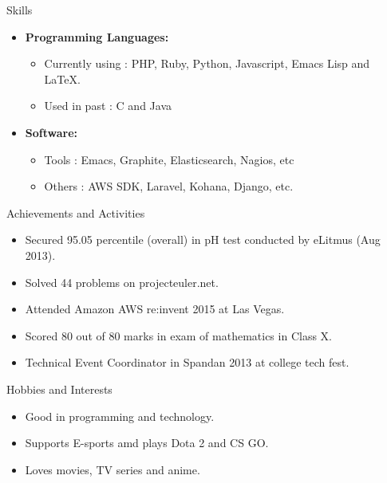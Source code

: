 \documentclass[11pt,oneside]{article}
\newenvironment{ressection}[1]{
  \vspace{4pt}
         {\fontfamily{phv}\selectfont\Large#1}
         \begin{itemize}
           \vspace{3pt}
}{
         \end{itemize}
}
\newcommand{\resitem}[1]{
  \vspace{-4pt}
\item \begin{flushleft} #1 \end{flushleft}
}
\newcommand{\ressubitem}[1]{
  \vspace{-1pt}
\item \begin{flushleft} #1 \end{flushleft}
}
\newenvironment{reslist}[1]{
  \resitem{\textbf{#1}}
  \vspace{-5pt}
  \begin{itemize}
}{
  \end{itemize}
}
\begin{document}

\begin{ressection}{Skills}
  \begin{reslist}{Programming Languages:}
    \ressubitem{Currently using : PHP, Ruby, Python, Javascript, Emacs Lisp and \LaTeX.}
    \ressubitem{Used in past : C and Java}
  \end{reslist}
  \begin{reslist}{Software:}
    \ressubitem{Tools : Emacs, Graphite, Elasticsearch, Nagios, etc}
    \ressubitem{Others : AWS SDK, Laravel, Kohana, Django, etc.}
  \end{reslist}
\end{ressection}


\begin{ressection}{Achievements and Activities}
  \resitem{Secured 95.05 percentile (overall) in pH test conducted by eLitmus (Aug 2013).}
  \resitem{Solved 44 problems on projecteuler.net.}
  \resitem{Attended Amazon AWS re:invent 2015 at Las Vegas.}
  \resitem{Scored 80 out of 80 marks in exam of mathematics in Class X.}
  \resitem{Technical Event Coordinator in Spandan 2013 at college tech fest.}
\end{ressection}


\begin{ressection}{Hobbies and Interests}
  \resitem{Good in programming and technology.}
  \resitem{Supports E-sports amd plays Dota 2 and CS GO.}
  \resitem{Loves movies, TV series and anime.}
\end{ressection}
\end{document}
